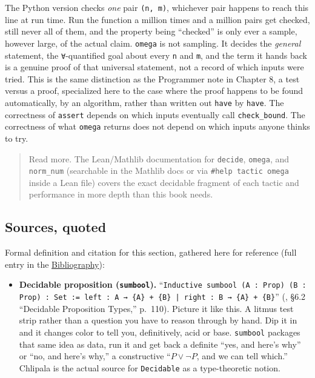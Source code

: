 The Python version checks \emph{one} pair \texttt{(n, m)}, whichever pair happens to reach this line at run time. Run the function a million times and a million pairs get checked, still never all of them, and the property being ``checked'' is only ever a sample, however large, of the actual claim. \texttt{omega} is not sampling. It decides the \emph{general} statement, the \texttt{∀}-quantified goal about every \texttt{n} and \texttt{m}, and the term it hands back is a genuine proof of that universal statement, not a record of which inputs were tried. This is the same distinction as the Programmer note in Chapter 8, a test versus a proof, specialized here to the case where the proof happens to be found automatically, by an algorithm, rather than written out \texttt{have} by \texttt{have}. The correctness of \texttt{assert} depends on which inputs eventually call \texttt{check\_\allowbreak{}bound}. The correctness of what \texttt{omega} returns does not depend on which inputs anyone thinks to try.

\begin{quote}
Read more. The Lean/Mathlib documentation for \texttt{decide}, \texttt{omega}, and \texttt{norm\_\allowbreak{}num} (searchable in the Mathlib docs or via \texttt{\#help tactic omega} inside a Lean file) covers the exact decidable fragment of each tactic and performance in more depth than this book needs.
\end{quote}

\subsection{Sources, quoted}\label{sec:13-working-efficiently:02-decision-procedures:2}

Formal definition and citation for this section, gathered here for reference (full entry in the \hyperref[sec:root:bibliography:1]{Bibliography}):

\begin{itemize}
\tightlist
\item
  \textbf{Decidable proposition (\texttt{sumbool}).} ``\texttt{Inductive sumbool (A : Prop) (B : Prop) : Set := left : A → \{A\} + \{B\} | right : B → \{A\} + \{B\}}'' (\cite{Chlipala2013}, §6.2 ``Decidable Proposition Types,'' p.~110). Picture it like this. A litmus test strip rather than a question you have to reason through by hand. Dip it in and it changes color to tell you, definitively, acid or base. \texttt{sumbool} packages that same idea as data, run it and get back a definite ``yes, and here's why'' or ``no, and here's why,'' a constructive ``\(P \vee \neg P\), and we can tell which.'' Chlipala is the actual source for \texttt{Decidable} as a type-theoretic notion.
\end{itemize}
